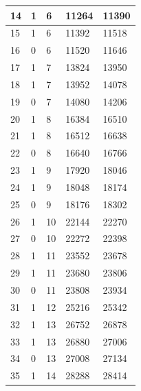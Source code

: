 \documentclass{article}
\begin{document}
\begin{table}[H]
\begin{center}
\begin{tabular}{| p{1cm} | p{1.75cm} | p{1.75cm} | p{1.75cm} | p{1.75cm} |}
                        \hline
                        14 & 1 & 6 & 11264 & 11390  \\
                        \hline
                        15 & 1 & 6 & 11392 & 11518  \\
                        \hline
                        16 & 0 & 6 & 11520 & 11646  \\
                        \hline
                        17 & 1 & 7 & 13824 & 13950  \\
                        \hline
                        18 & 1 & 7 & 13952 & 14078  \\
                        \hline
                        19 & 0 & 7 & 14080 & 14206  \\
                        \hline
                        20 & 1 & 8 & 16384 & 16510  \\
                        \hline
                        21 & 1 & 8 & 16512 & 16638  \\
                        \hline
                        22 & 0 & 8 & 16640 & 16766  \\
                        \hline
                        23 & 1 & 9 & 17920 & 18046  \\
                        \hline
                        24 & 1 & 9 & 18048 & 18174  \\
                        \hline
                        25 & 0 & 9 & 18176 & 18302  \\
                        \hline
                        26 & 1 & 10 & 22144 & 22270  \\
                        \hline
                        27 & 0 & 10 & 22272 & 22398  \\
                        \hline
                        28 & 1 & 11 & 23552 & 23678  \\
                        \hline
                        29 & 1 & 11 & 23680 & 23806  \\
                        \hline
                        30 & 0 & 11 & 23808 & 23934  \\
                        \hline
                        31 & 1 & 12 & 25216 & 25342  \\
                        \hline
                        32 & 1 & 13 & 26752 & 26878  \\
                        \hline
                        33 & 1 & 13 & 26880 & 27006  \\
                        \hline
                        34 & 0 & 13 & 27008 & 27134  \\
                        \hline
                        35 & 1 & 14 & 28288 & 28414  \\
                        \hline
                    \end{tabular}
                \end{center}
            \end{table}
\end{document}
